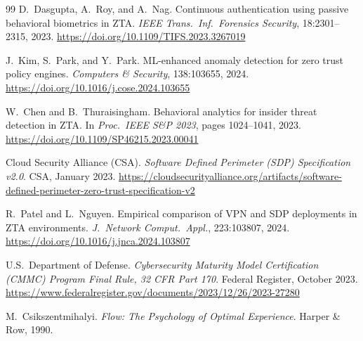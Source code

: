 \documentclass[sigconf,nonacm]{acmart}
\begin{document}
\begin{thebibliography}{99}
D.~Dasgupta, A.~Roy, and A.~Nag.
\newblock Continuous authentication using passive behavioral biometrics in ZTA.
\newblock \textit{IEEE Trans.\ Inf.\ Forensics Security}, 18:2301--2315, 2023.
\newblock \url{https://doi.org/10.1109/TIFS.2023.3267019}

J.~Kim, S.~Park, and Y.~Park.
\newblock ML-enhanced anomaly detection for zero trust policy engines.
\newblock \textit{Computers \& Security}, 138:103655, 2024.
\newblock \url{https://doi.org/10.1016/j.cose.2024.103655}

W.~Chen and B.~Thuraisingham.
\newblock Behavioral analytics for insider threat detection in ZTA.
\newblock In \textit{Proc.\ IEEE S\&P 2023}, pages 1024--1041, 2023.
\newblock \url{https://doi.org/10.1109/SP46215.2023.00041}

Cloud Security Alliance (CSA).
\newblock \textit{Software Defined Perimeter (SDP) Specification v2.0}.
\newblock CSA, January 2023.
\newblock \url{https://cloudsecurityalliance.org/artifacts/software-defined-perimeter-zero-trust-specification-v2}

R.~Patel and L.~Nguyen.
\newblock Empirical comparison of VPN and SDP deployments in ZTA environments.
\newblock \textit{J.\ Network Comput.\ Appl.}, 223:103807, 2024.
\newblock \url{https://doi.org/10.1016/j.jnca.2024.103807}

U.S.\ Department of Defense.
\newblock \textit{Cybersecurity Maturity Model Certification (CMMC) Program
Final Rule, 32 CFR Part 170}.
\newblock Federal Register, October 2023.
\newblock \url{https://www.federalregister.gov/documents/2023/12/26/2023-27280}

M.~Csikszentmihalyi.
\newblock \textit{Flow: The Psychology of Optimal Experience}.
\newblock Harper \& Row, 1990.

\end{thebibliography}
\end{document}
